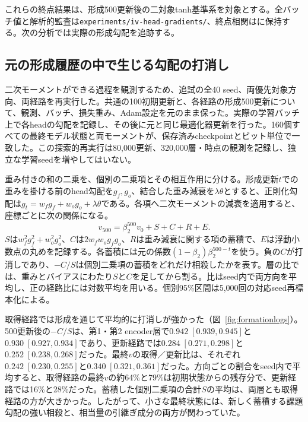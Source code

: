 これらの終点結果は、形成500更新後の二対象tanh基準系を対象とする。全バッチ値と解析的監査は\texttt{experiments/iv-head-gradients/}、終点相関はに保持する。次の分析では実際の形成勾配を追跡する。


\subsection{元の形成履歴の中で生じる勾配の打消し}
\label{app:formationlogs}
二次モーメントができる過程を観測するため、追試の全40 seed、両優先対象方向、両経路を再実行した。共通の100初期更新と、各経路の形成500更新について、観測、バッチ、損失重み、Adam設定を元のまま保った。実際の学習バッチ上で各headの勾配を記録し、その後に元と同じ最適化器更新を行った。160個すべての最終モデル状態と両モーメントが、保存済みcheckpointとビット単位で一致した。この探索的再実行は80,000更新、320,000層・時点の観測を記録し、独立な学習seedを増やしてはいない。

重み付きの和の二乗を、個別の二乗項とその相互作用に分ける。形成更新$t$での重みを掛ける前のhead勾配を$g_f,g_o$、結合した重み減衰を$\lambda\theta$とすると、正則化勾配は$g_t=w_fg_f+w_og_o+\lambda\theta$である。各項へ二次モーメントの減衰を適用すると、座標ごとに次の関係になる。
\begin{equation}
v_{500}=\beta_2^{500}v_0+S+C+R+E.
\end{equation}
$S$は$w_f^2g_f^2+w_o^2g_o^2$、$C$は$2w_fw_og_fg_o$、$R$は重み減衰に関する項の蓄積で、$E$は浮動小数点の丸めを記録する。各蓄積には元の係数$(1-\beta_2)\beta_2^{500-t}$を使う。負の$C$が打消しであり、$-C/S$は個別二乗項の蓄積をどれだけ相殺したかを表す。層の比では、重みとバイアスにわたり$S$と$C$を足してから割る。比はseed内で両方向を平均し、正の経路比には対数平均を用いる。個別95\%区間は5,000回の対応seed再標本化による。

取得経路では形成を通じて平均的に打消しが強かった（図~\ref{fig:formationlogs}）。500更新後の$-C/S$は、第1・第2 encoder層で$0.942\;[0.939,0.945]$と$0.930\;[0.927,0.934]$であり、更新経路では$0.284\;[0.271,0.298]$と$0.252\;[0.238,0.268]$だった。最終$v$の取得／更新比は、それぞれ$0.242\;[0.230,0.255]$と$0.340\;[0.321,0.361]$だった。方向ごとの割合をseed内で平均すると、取得経路の最終$v$の約64\%と79\%は初期状態からの残存分で、更新経路では16\%と28\%だった。蓄積した個別二乗項の合計$S$の平均は、両層とも取得経路の方が大きかった。したがって、小さな最終状態には、新しく蓄積する課題勾配の強い相殺と、相当量の引継ぎ成分の両方が関わっていた。

